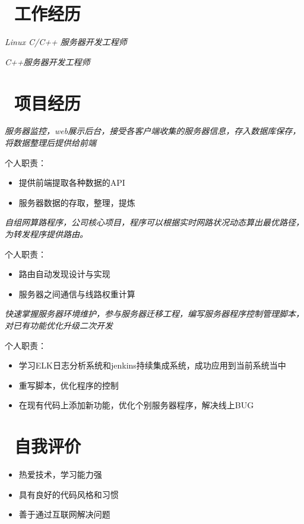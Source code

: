 \documentclass{resume}
\begin{document}
\section{\faUsers\ 工作经历}
\textit{Linux C/C++ 服务器开发工程师}


\textit{C++服务器开发工程师}

\section{\faAsterisk\ 项目经历}
\textit{服务器监控，web展示后台，接受各客户端收集的服务器信息，存入数据库保存，将数据整理后提供给前端}

\begin{onehalfspacing}
个人职责：
\begin{itemize}[parsep=0.5ex]
\item 提供前端提取各种数据的API
\item 服务器数据的存取，整理，提炼
\end{itemize}
\end{onehalfspacing}

\textit{自组网算路程序，公司核心项目，程序可以根据实时网路状况动态算出最优路径，为转发程序提供路由。}

\begin{onehalfspacing}
个人职责：
\begin{itemize}[parsep=0.5ex]
\item 路由自动发现设计与实现
\item 服务器之间通信与线路权重计算
\end{itemize}
\end{onehalfspacing}

\textit{快速掌握服务器环境维护，参与服务器迁移工程，编写服务器程序控制管理脚本，对已有功能优化升级二次开发}

\begin{onehalfspacing}
个人职责：
\begin{itemize}[parsep=0.5ex]
\item 学习ELK日志分析系统和jenkins持续集成系统，成功应用到当前系统当中
\item 重写脚本，优化程序的控制
\item 在现有代码上添加新功能，优化个别服务器程序，解决线上BUG
\end{itemize}
\end{onehalfspacing}

\section{\faInfo\ 自我评价}
\begin{itemize}[parsep=0.5ex]
  \item 热爱技术，学习能力强
  \item 具有良好的代码风格和习惯
  \item 善于通过互联网解决问题
\end{itemize}

%
%
\end{document}
